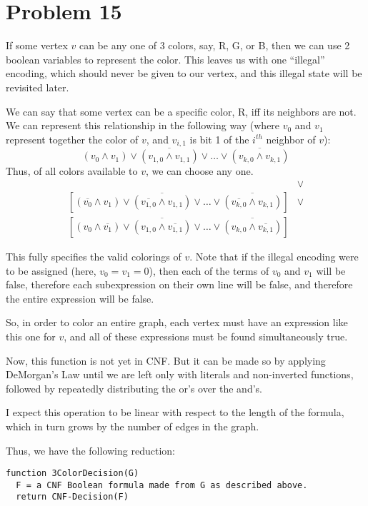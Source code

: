 \documentclass{article}
\providecommand{\prob}[1]{\section*{Problem #1}}
\begin{document}
\pagebreak
\prob{15}
If some vertex $v$ can be any one of 3 colors, say, R, G, or B, then we can use 2 boolean variables to represent the color.
This leaves us with one ``illegal'' encoding, which should never be given to our vertex, and this illegal state will be revisited later.

We can say that some vertex can be a specific color, R, iff its neighbors are not.
We can represent this relationship in the following way (where $v_0$ and $v_1$ represent together the color of $v$, and $v_{i, 1}$ is bit 1 of the $i^{th}$ neighbor of $v$):
\[
  (v_0 \land v_1) \lor 
  \overline{(v_{1,0} \land v_{1,1})} \lor \dots \lor
  \overline{(v_{k,0} \land v_{k,1})} 
\]
Thus, of all colors available to $v$, we can choose any one.
\begin{align*}
  [
    (v_0 \land v_1) \lor 
    \overline{(v_{1,0} \land v_{1,1})} \lor \dots \lor
    \overline{(v_{k,0} \land v_{k,1})}
  ] &\lor\\ [
    (\overline{v_0} \land v_1) \lor 
    \overline{(\overline{v_{1,0}} \land v_{1,1})} \lor \dots \lor
    \overline{(\overline{v_{k,0}} \land v_{k,1})}
  ] &\lor\\ [
    (v_0 \land \overline{v_1}) \lor 
    \overline{(v_{1,0} \land \overline{v_{1,1}})} \lor \dots \lor
    \overline{(v_{k,0} \land \overline{v_{k,1}})}
  ]
\end{align*}

This fully specifies the valid colorings of $v$.
Note that if the illegal encoding were to be assigned (here, $v_0 = v_1 = 0$), then each of the terms of $v_0$ and $v_1$ will be false, therefore each subexpression on their own line will be false, and therefore the entire expression will be false.

So, in order to color an entire graph, each vertex must have an expression like this one for $v$, and all of these expressions must be found simultaneously true.

Now, this function is not yet in CNF.
But it can be made so by applying DeMorgan's Law until we are left only with literals and non-inverted functions, followed by repeatedly distributing the or's over the and's.

I expect this operation to be linear with respect to the length of the formula, which in turn grows by the number of edges in the graph.

Thus, we have the following reduction:
\begin{lstlisting}
function 3ColorDecision(G)
  F = a CNF Boolean formula made from G as described above.
  return CNF-Decision(F)
\end{lstlisting}
\end{document}
